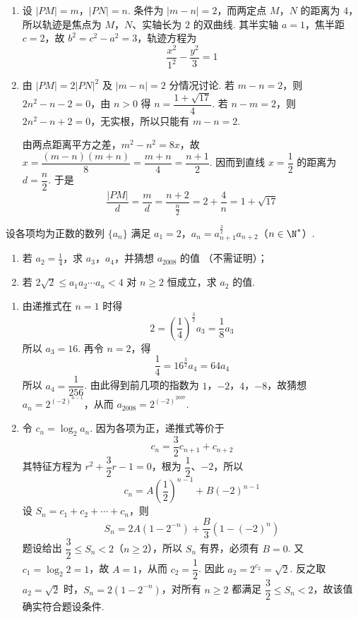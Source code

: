 \begin{solution}
\begin{enumerate}
\item 设 \(|PM|=m\)，\(|PN|=n\). 条件为 \(|m-n|=2\)，而两定点 \(M\)，\(N\) 的距离为 \(4\)，所以轨迹是焦点为 \(M\)，\(N\)、实轴长为 \(2\) 的双曲线. 其半实轴 \(a=1\)，焦半距 \(c=2\)，故 \(b^{2}=c^{2}-a^{2}=3\)，轨迹方程为
\[
\frac{x^{2}}{1^{2}}-\frac{y^{2}}{3}=1
\]
\item 由 \(|PM|=2|PN|^{2}\) 及 \(|m-n|=2\) 分情况讨论. 若 \(m-n=2\)，则 \(2n^{2}-n-2=0\)，由 \(n>0\) 得 \(n=\dfrac{1+\sqrt{17}}{4}\). 若 \(n-m=2\)，则 \(2n^{2}-n+2=0\)，无实根，所以只能有 \(m-n=2\).

由两点距离平方之差，\(m^{2}-n^{2}=8x\)，故 \(x=\dfrac{(m-n)(m+n)}{8}=\dfrac{m+n}{4}=\dfrac{n+1}{2}\). 因而到直线 \(x=\dfrac12\) 的距离为 \(d=\dfrac{n}{2}\). 于是
\[
\frac{|PM|}{d}=\frac{m}{d}=\frac{n+2}{\frac{n}{2}}=2+\frac4n=1+\sqrt{17}
\]
\end{enumerate}
\end{solution}

\begin{problem}
设各项均为正数的数列 \(\{a_{n}\}\) 满足 \(a_1 = 2\)，\(a_n = a_{n+1}^{\frac{3}{2}} a_{n+2}\)（\(n \in \N^*\)）.
\begin{enumerate}
\item 若 \(a_2 = \frac{1}{4}\)，求 \(a_3\)，\(a_4\)，并猜想 \(a_{2008}\) 的值 （不需证明）；
\item 若 \(2\sqrt{2} \leqslant a_1a_2 \cdots a_n < 4\) 对 \(n \geqslant 2\) 恒成立，求 \(a_2\) 的值.
\end{enumerate}
\end{problem}

\begin{solution}
\begin{enumerate}
\item 由递推式在 \(n=1\) 时得
\[
2=\left(\frac14\right)^{\frac32}a_{3}=\frac18a_{3}
\]
所以 \(a_{3}=16\). 再令 \(n=2\)，得
\[
\frac14=16^{\frac32}a_{4}=64a_{4}
\]
所以 \(a_{4}=\dfrac{1}{256}\). 由此得到前几项的指数为 \(1\)，\(-2\)，\(4\)，\(-8\)，故猜想 \(a_{n}=2^{(-2)^{n-1}}\)，从而 \(a_{2008}=2^{(-2)^{2007}}\).
\item 令 \(c_{n}=\log_{2}a_{n}\). 因为各项为正，递推式等价于
\[
c_{n}=\frac32c_{n+1}+c_{n+2}
\]
其特征方程为 \(r^{2}+\dfrac32r-1=0\)，根为 \(\dfrac12\)、\(-2\)，所以
\[
c_{n}=A\left(\frac12\right)^{n-1}+B(-2)^{n-1}
\]
设 \(S_{n}=c_{1}+c_{2}+\cdots+c_{n}\)，则
\[
S_{n}=2A\left(1-2^{-n}\right)+\frac{B}{3}\left(1-(-2)^{n}\right)
\]
题设给出 \(\dfrac32\leqslant S_{n}<2\)（\(n\geqslant2\)），所以 \(S_n\) 有界，必须有 \(B=0\). 又 \(c_{1}=\log_{2}2=1\)，故 \(A=1\)，从而 \(c_{2}=\dfrac12\). 因此 \(a_{2}=2^{c_{2}}=\sqrt{2}\). 反之取 \(a_{2}=\sqrt{2}\) 时，\(S_{n}=2(1-2^{-n})\)，对所有 \(n\geqslant2\) 都满足 \(\dfrac32\leqslant S_{n}<2\)，故该值确实符合题设条件.
\end{enumerate}
\end{solution}
